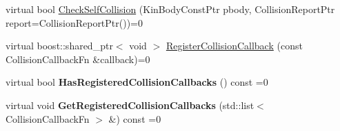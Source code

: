 \begin{DoxyCompactItemize}
\item 
virtual bool \hyperlink{classOpenRAVE_1_1EnvironmentBase_a5e1f41d8d334da4d500a4cc107bfb696}{CheckSelfCollision} (KinBodyConstPtr pbody, CollisionReportPtr report=CollisionReportPtr())=0
\item 
virtual boost::shared\_\-ptr$<$ void $>$ \hyperlink{classOpenRAVE_1_1EnvironmentBase_a04548c3dc0b848f82c493a27ce85aedc}{RegisterCollisionCallback} (const CollisionCallbackFn \&callback)=0
\item 
\hypertarget{classOpenRAVE_1_1EnvironmentBase_af5c319a9f6a30e2dbc270ddb33199ffa}{
virtual bool {\bfseries HasRegisteredCollisionCallbacks} () const =0}
\label{classOpenRAVE_1_1EnvironmentBase_af5c319a9f6a30e2dbc270ddb33199ffa}

\item 
\hypertarget{classOpenRAVE_1_1EnvironmentBase_a9333624d7ad9c3bc97f68bbe80d73f0f}{
virtual void {\bfseries GetRegisteredCollisionCallbacks} (std::list$<$ CollisionCallbackFn $>$ \&) const =0}
\label{classOpenRAVE_1_1EnvironmentBase_a9333624d7ad9c3bc97f68bbe80d73f0f}

\end{DoxyCompactItemize}
